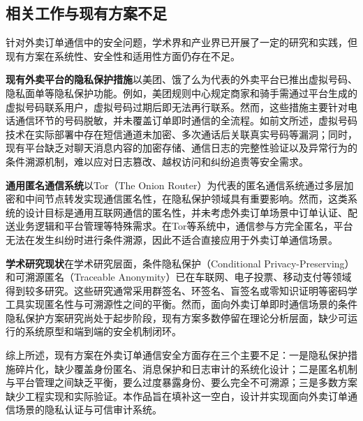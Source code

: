 \subsection{相关工作与现有方案不足}

针对外卖订单通信中的安全问题，学术界和产业界已开展了一定的研究和实践，但现有方案在系统性、安全性和适用性方面仍存在不足。

\textbf{现有外卖平台的隐私保护措施}\quad 以美团、饿了么为代表的外卖平台已推出虚拟号码、隐私面单等隐私保护功能。例如，美团规则中心规定商家和骑手需通过平台生成的虚拟号码联系用户，虚拟号码过期后即无法再行联系。然而，这些措施主要针对电话通信环节的号码脱敏，并未覆盖订单即时通信的全流程。如前文所述，虚拟号码技术在实际部署中存在短信通道未加密、多次通话后关联真实号码等漏洞；同时，现有平台缺乏对聊天消息内容的加密存储、通信日志的完整性验证以及异常行为的条件溯源机制，难以应对日志篡改、越权访问和纠纷追责等安全需求。

\textbf{通用匿名通信系统}\quad 以Tor（The Onion Router）为代表的匿名通信系统通过多层加密和中间节点转发实现通信匿名性，在隐私保护领域具有重要影响。然而，这类系统的设计目标是通用互联网通信的匿名性，并未考虑外卖订单场景中订单认证、配送业务逻辑和平台管理等特殊需求。在Tor等系统中，通信参与方完全匿名，平台无法在发生纠纷时进行条件溯源，因此不适合直接应用于外卖订单通信场景。

\textbf{学术研究现状}\quad 在学术研究层面，条件隐私保护（Conditional Privacy-Preserving）和可溯源匿名（Traceable Anonymity）已在车联网、电子投票、移动支付等领域得到较多研究。这些研究通常采用群签名、环签名、盲签名或零知识证明等密码学工具实现匿名性与可溯源性之间的平衡。然而，面向外卖订单即时通信场景的条件隐私保护方案研究尚处于起步阶段，现有方案多数停留在理论分析层面，缺少可运行的系统原型和端到端的安全机制闭环。

综上所述，现有方案在外卖订单通信安全方面存在三个主要不足：一是隐私保护措施碎片化，缺少覆盖身份匿名、消息保护和日志审计的系统化设计；二是匿名机制与平台管理之间缺乏平衡，要么过度暴露身份、要么完全不可溯源；三是多数方案缺少工程实现和实际验证。本作品旨在填补这一空白，设计并实现面向外卖订单通信场景的隐私认证与可信审计系统。